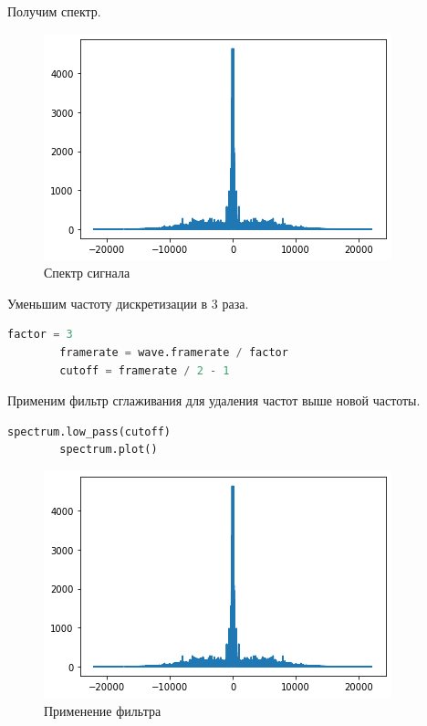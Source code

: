 \documentclass[a4paper, 14pt]{extarticle}
\begin{document}
    Получим спектр.

    \begin{figure}[H]
        \centering
        \includegraphics[width=0.8\linewidth]{drum_spectrum}
        \caption{Спектр сигнала}
        \label{fig:drum_spectrum}
    \end{figure}

    Уменьшим частоту дискретизации в 3 раза.

    \begin{lstlisting}[language=Python, caption= Уменьшение частоты дискретизации, label={lst:downsampling}]
        factor = 3
        framerate = wave.framerate / factor
        cutoff = framerate / 2 - 1
    \end{lstlisting}

    Применим фильтр сглаживания для удаления частот выше новой частоты.

    \begin{lstlisting}[language=Python, caption= Применение фильтра, label={lst:apply_filter}]
        spectrum.low_pass(cutoff)
        spectrum.plot()
    \end{lstlisting}

    \begin{figure}[H]
        \centering
        \includegraphics[width=0.8\linewidth]{drum_after_filter}
        \caption{Применение фильтра}
        \label{fig:drum_after_filter}
    \end{figure}
\end{document}
